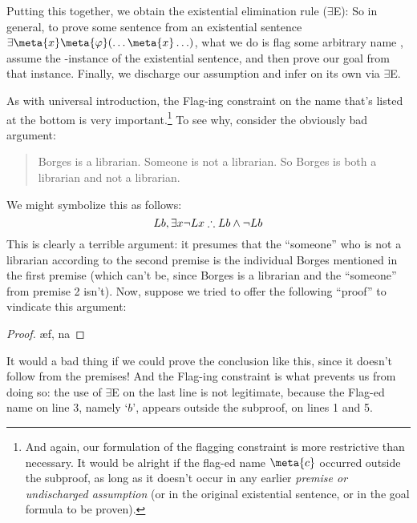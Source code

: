 Putting this together, we obtain the existential elimination rule ($\exists$E):
So in general, to prove some sentence \meta{\psi} from an existential sentence $\exists \meta{x}\meta{\varphi}(\ldots \meta{x} \ldots)$, what we do is flag some arbitrary name , assume the -instance of the existential sentence, and then prove our goal \meta{\psi} from that instance.  Finally, we discharge our assumption and infer \meta{\psi} on its own via $\exists$E.

As with universal introduction, the Flag-ing constraint on the name  that's listed at the bottom is very important.\footnote{And again, our formulation of the flagging constraint is more restrictive than necessary.  It would be alright if the flag-ed name $\meta{c}$ occurred outside the subproof, as long as it doesn't occur in any earlier \emph{premise or undischarged assumption} (or in the original existential sentence, or in the goal formula to be proven).}
To see why, consider the obviously bad argument:
	\begin{quote}
		Borges is a librarian. Someone is not a librarian. So Borges is both a librarian and not a librarian. 	\end{quote}
We might symbolize this as follows:
$$Lb, \exists x \neg Lx \therefore Lb \wedge \neg Lb$$
This is clearly a terrible argument: it presumes that the ``someone'' who is not a librarian according to the second premise is the individual Borges mentioned in the first premise (which can't be, since Borges is a librarian and the ``someone'' from premise 2 isn't).  Now, suppose we tried to offer the following ``proof'' to vindicate this argument:
\begin{proof}
	 
	 
	\open
		 
		\ae{f, na}
	\close
\end{proof}
It would a bad thing if we could prove the conclusion like this, since it doesn't follow from the premises!  And the Flag-ing constraint is what prevents us from doing so:  the use of $\exists$E on the last line is not legitimate, because the Flag-ed name on line 3, namely `$b$', appears outside the subproof, on lines 1 and 5.


